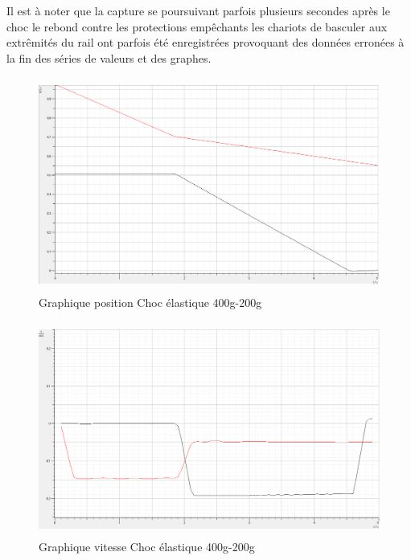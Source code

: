 Il est à noter que la capture se poursuivant parfois plusieurs secondes après le choc le rebond contre les protections empêchants les chariots de basculer aux extrêmités du rail ont parfois été enregistrées provoquant des données erronées à la fin des séries de valeurs et des graphes.

\begin{figure}[h]
    \caption[Graphique position Choc élastique 400g-200g]{Graphique position Choc élastique 400g-200g}
    \centering
    \includegraphics[height=19em]{Data/400-200ela01.png}
\end{figure}

\begin{figure}[h]
    \caption[Graphique vitesse Choc élastique 400g-200g]{Graphique vitesse Choc élastique 400g-200g}
    \centering
    \includegraphics[height=19em]{Data/400-200ela02v.png}
\end{figure}

\newpage

